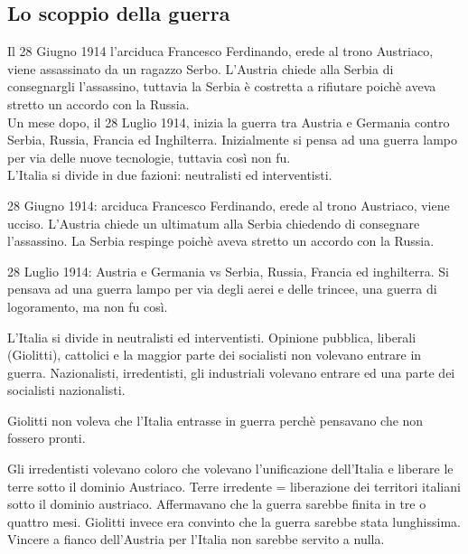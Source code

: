 \documentclass{article}
\begin{document}
\subsection{Lo scoppio della guerra}

Il 28 Giugno 1914 l'arciduca Francesco Ferdinando, erede al trono Austriaco, viene assassinato da un ragazzo Serbo.
L'Austria chiede alla Serbia di consegnargli l'assassino, tuttavia la Serbia è costretta a rifiutare poichè aveva
stretto un accordo con la Russia.\\
Un mese dopo, il 28 Luglio 1914, inizia la guerra tra Austria e Germania contro Serbia, Russia, Francia ed Inghilterra.
Inizialmente si pensa ad una guerra lampo per via delle nuove tecnologie, tuttavia così non fu.\\
\newline
L'Italia si divide in due fazioni: neutralisti ed interventisti.



28 Giugno 1914: arciduca Francesco Ferdinando, erede al trono Austriaco, viene ucciso.
L'Austria chiede un ultimatum alla Serbia chiedendo di consegnare l'assassino. La Serbia respinge poichè aveva stretto
un accordo con la Russia.

28 Luglio 1914: Austria e Germania vs Serbia, Russia, Francia ed inghilterra.
Si pensava ad una guerra lampo per via degli aerei e delle trincee, una guerra di logoramento, ma non fu così.

L'Italia si divide in neutralisti ed interventisti.
Opinione pubblica, liberali (Giolitti), cattolici e la maggior parte dei socialisti non volevano entrare in guerra.
Nazionalisti, irredentisti, gli industriali volevano entrare ed una parte dei socialisti nazionalisti.

Giolitti non voleva che l'Italia entrasse in guerra perchè pensavano che non fossero pronti.

Gli irredentisti volevano coloro che volevano l'unificazione dell'Italia e liberare le terre sotto il dominio Austriaco.
Terre irredente = liberazione dei territori italiani sotto il dominio austriaco.
Affermavano che la guerra sarebbe finita in tre o quattro mesi.
Giolitti invece era convinto che la guerra sarebbe stata lunghissima.
Vincere a fianco dell'Austria per l'Italia non sarebbe servito a nulla.
\end{document}
